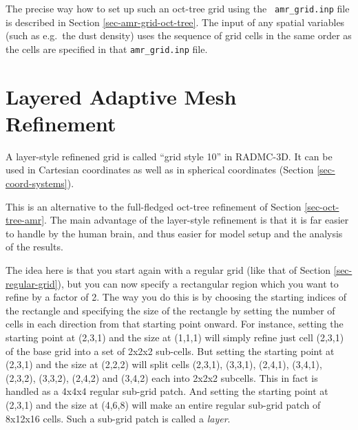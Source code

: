 \documentclass{report}
\begin{document}
The precise way how to set up such an oct-tree grid using the {\small\tt
  amr\_grid.inp} file is described in Section \ref{sec-amr-grid-oct-tree}.
The input of any spatial variables (such as e.g.\ the dust density) uses the
sequence of grid cells in the same order as the cells are specified in that
{\small\tt amr\_grid.inp} file.


\section{Layered Adaptive Mesh Refinement}
\label{sec-layered-amr}
%
A layer-style refinened grid is called ``grid style 10'' in RADMC-3D. It can
be used in Cartesian coordinates as well as in spherical coordinates
(Section \ref{sec-coord-systems}).

This is an alternative to the full-fledged oct-tree refinement of Section
\ref{sec-oct-tree-amr}. The main advantage of the layer-style refinement is
that it is far easier to handle by the human brain, and thus easier for 
model setup  and the analysis of the results. 

The idea here is that you start again with a regular grid (like that of
Section \ref{sec-regular-grid}), but you can now specify a rectangular
region which you want to refine by a factor of 2. The way you do this is by
choosing the starting indices of the rectangle and specifying the size of
the rectangle by setting the number of cells in each direction from that
starting point onward. For instance, setting the starting point at (2,3,1)
and the size at (1,1,1) will simply refine just cell (2,3,1) of the base
grid into a set of 2x2x2 sub-cells. But setting the starting point at
(2,3,1) and the size at (2,2,2) will split cells (2,3,1), (3,3,1), (2,4,1),
(3,4,1), (2,3,2), (3,3,2), (2,4,2) and (3,4,2) each into 2x2x2 subcells.
This in fact is handled as a 4x4x4 regular sub-grid patch. And setting the
starting point at (2,3,1) and the size at (4,6,8) will make an entire
regular sub-grid patch of 8x12x16 cells. Such a sub-grid patch is
called a {\em layer}.
\end{document}
